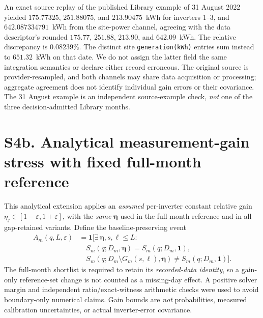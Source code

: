 \documentclass[11pt]{article}
\begin{document}
An exact source replay of the published Library example of 31 August 2022 yielded $175.77325$, $251.88075$, and $213.90475$~kWh for inverters 1--3, and $642.087334791$~kWh from the site-power channel, agreeing with the data descriptor's rounded $175.77$, $251.88$, $213.90$, and $642.09$~kWh. The relative discrepancy is $0.08239\%$. The distinct site \texttt{generation(kWh)} entries sum instead to $651.32$~kWh on that date. We do not assign the latter field the same integration semantics or declare either record erroneous. The original source is provider-resampled, and both channels may share data acquisition or processing; aggregate agreement does not identify individual gain errors or their covariance. The 31 August example is an independent source-example check, \emph{not} one of the three decision-admitted Library months.

\section*{S4b. Analytical measurement-gain stress with fixed full-month reference}
This analytical extension applies an \emph{assumed} per-inverter constant relative gain $\eta_j\in[1-\varepsilon,1+\varepsilon]$, with the \emph{same} $\boldsymbol{\eta}$ used in the full-month reference and in all gap-retained variants. Define the baseline-preserving event
\[
\begin{aligned}
A_m(q,L,\varepsilon)&=\mathbf{1}\!\big[
\exists\,\boldsymbol{\eta},s,\ell\leq L:
\\[-0.15em]
&\quad S_m(q;D_m,\boldsymbol{\eta})
=S_m(q;D_m,\mathbf{1}),\\[-0.1em]
&\quad S_m(q;D_m\setminus G_m(s,\ell),\boldsymbol{\eta})
\ne S_m(q;D_m,\mathbf{1})\big].
\end{aligned}
\]
The full-month shortlist is required to retain its \emph{recorded-data identity}, so a gain-only reference-set change is not counted as a missing-day effect. A positive solver margin and independent ratio/exact-witness arithmetic checks were used to avoid boundary-only numerical claims. Gain bounds are \emph{not} probabilities, measured calibration uncertainties, or actual inverter-error covariance.
\end{document}
